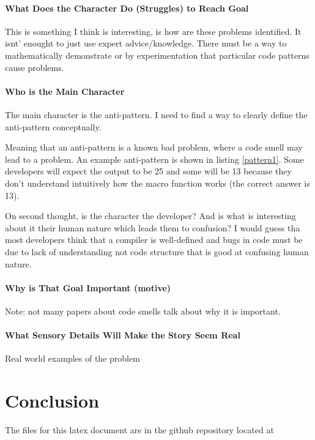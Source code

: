\documentclass[conference]{IEEEtran}
\begin{document}
\paragraph{What Does the Character Do (Struggles) to Reach Goal}
This is something I think is interesting, is how are these problems identified.
It isnt' enought to just use expert advice/knowledge. 
There must be a way to mathematically demonstrate or by experimentation that particular code patterns cause problems.

\paragraph{Who is the Main Character}
The main character is the anti-pattern. I need to find a way to clearly define the anti-pattern conceptually. 

Meaning that an anti-pattern is a known bad problem, where a code smell may lead to a problem.
An example anti-pattern is shown in listing \ref{pattern1}. Some developers will expect the output to be 25 and some will be 13 because they don't understand intuitively how the macro function works (the correct answer is 13).

On second thought, is the character the developer? 
And is what is interesting about it their human nature which leads them to confusion?
I would guess tha most developers think that a compiler is well-defined and bugs in code must be due to lack of understanding not code structure that is good at confusing human nature.

\paragraph{Why is That Goal Important (motive)}
Note: not many papers about code smells talk about why it is important.

\paragraph{What Sensory Details Will Make the Story Seem Real}
Real world examples of the problem

\section{Conclusion}

The files for this latex document are in the github repository located at 

\nocite{*}

\clearpage


\end{document}
